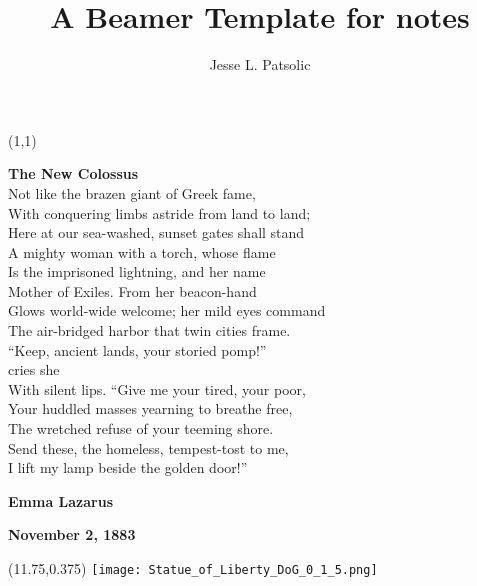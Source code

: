 \documentclass[xcolor=dvipsnames, aspectratio=169]{beamer}
\title[Daily Notes]{A Beamer Template for notes}
\subtitle[]{}
\author[JLP]{Jesse L. Patsolic}
\begin{document}
\begin{frame}[plain]
\begin{textblock}{5}(1,1)
{\color{gray!!50}
\rm
\tiny
\textbf{The New Colossus}\\

Not like the brazen giant of Greek fame,\\
With conquering limbs astride from land to land;\\
Here at our sea-washed, sunset gates shall stand\\
A mighty woman with a torch, whose flame\\
Is the imprisoned lightning, and her name\\
Mother of Exiles. From her beacon-hand\\
Glows world-wide welcome; her mild eyes command\\
The air-bridged harbor that twin cities frame.\\
``Keep, ancient lands, your storied pomp!''\\ 
    cries she\\
With silent lips. ``Give me your tired, your poor,\\
Your huddled masses yearning to breathe free,\\
The wretched refuse of your teeming shore.\\
Send these, the homeless, tempest-tost to me,\\
I lift my lamp beside the golden door!''\\
\vphantom{|}

\textbf{Emma Lazarus}

\textbf{November 2, 1883}
}

\end{textblock}

\begin{textblock}{5}(11.75,0.375)
\texttt{[image: Statue\_of\_Liberty\_DoG\_0\_1\_5.png]}

\end{textblock}
\end{frame}
\end{document}

